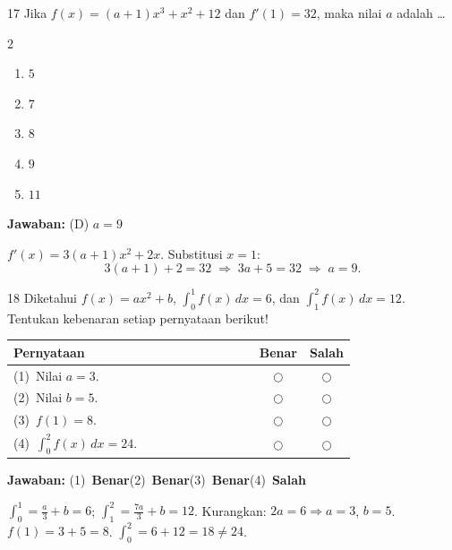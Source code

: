\documentclass[11pt]{article}
\newcommand{\jawaban}[1]{%
  \noindent\colorbox{gold!30}{\parbox{\dimexpr\linewidth-2\fboxsep\relax}{%
    \textbf{Jawaban:} #1}}\par\smallskip}
\newenvironment{pilB}{%
  \par\smallskip\begin{multicols}{2}
  \begin{enumerate}[label=(\Alph*),leftmargin=*,itemsep=1pt,topsep=3pt]}%
  {\end{enumerate}\end{multicols}}
\begin{document}
\begin{soal}{17}
Jika $f(x)=(a+1)x^3+x^2+12$ dan $f'(1)=32$,
maka nilai $a$ adalah \ldots
\begin{pilB}
  \item $5$ \item $7$ \item $8$ \item $9$ \item $11$
\end{pilB}
\end{soal}
\begin{pembox}
\jawaban{(D) $a=9$}
$f'(x)=3(a+1)x^2+2x$. Substitusi $x=1$:
\[ 3(a+1)+2=32\;\Rightarrow\;3a+5=32\;\Rightarrow\;a=9. \]
\end{pembox}

\begin{soal}{18}
Diketahui $f(x)=ax^2+b$,\;
$\displaystyle\int_0^1 f(x)\,dx=6$,\;
dan $\displaystyle\int_1^2 f(x)\,dx=12$.
Tentukan kebenaran setiap pernyataan berikut!

\par\smallskip
{\renewcommand{\arraystretch}{1.4}%
\begin{tabular}{@{}p{0.76\linewidth}cc@{}}
\hline
\textbf{Pernyataan} & \textbf{Benar} & \textbf{Salah}\\
\hline
(1)~Nilai $a=3$.
  & $\bigcirc$ & $\bigcirc$\\
(2)~Nilai $b=5$.
  & $\bigcirc$ & $\bigcirc$\\
(3)~$f(1)=8$.
  & $\bigcirc$ & $\bigcirc$\\
(4)~$\displaystyle\int_0^2 f(x)\,dx=24$.
  & $\bigcirc$ & $\bigcirc$\\
\hline
\end{tabular}}
\end{soal}
\begin{pembox}
\jawaban{(1)~\textbf{Benar}\quad(2)~\textbf{Benar}\quad(3)~\textbf{Benar}\quad(4)~\textbf{Salah}}
$\int_0^1=\tfrac{a}{3}+b=6$;\; $\int_1^2=\tfrac{7a}{3}+b=12$. Kurangkan: $2a=6\Rightarrow a=3$, $b=5$.
$f(1)=3+5=8$.\; $\int_0^2=6+12=18\neq24$.
\end{pembox}
\end{document}
